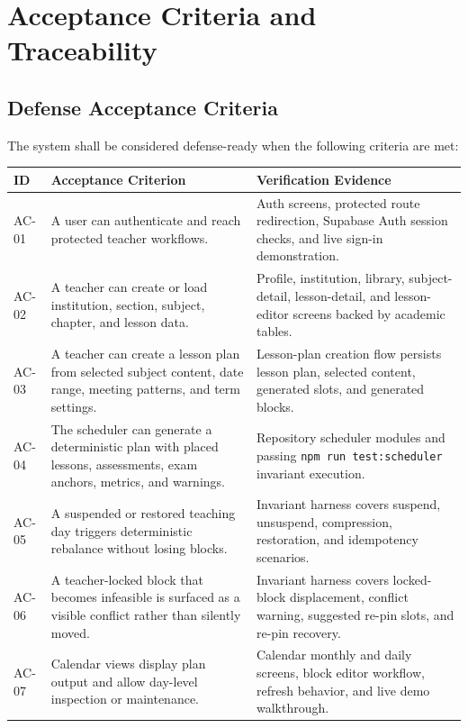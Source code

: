 \documentclass[12pt]{article}
\begin{document}
\section{Acceptance Criteria and Traceability}

\subsection{Defense Acceptance Criteria}

The system shall be considered defense-ready when the following criteria are met:

\begin{longtable}{|L{2.7cm}|L{5.4cm}|L{5.4cm}|}
\hline
\textbf{ID} & \textbf{Acceptance Criterion} & \textbf{Verification Evidence} \\
\hline
AC-01 & A user can authenticate and reach protected teacher workflows. & Auth screens, protected route redirection, Supabase Auth session checks, and live sign-in demonstration. \\
\hline
AC-02 & A teacher can create or load institution, section, subject, chapter, and lesson data. & Profile, institution, library, subject-detail, lesson-detail, and lesson-editor screens backed by academic tables. \\
\hline
AC-03 & A teacher can create a lesson plan from selected subject content, date range, meeting patterns, and term settings. & Lesson-plan creation flow persists lesson plan, selected content, generated slots, and generated blocks. \\
\hline
AC-04 & The scheduler can generate a deterministic plan with placed lessons, assessments, exam anchors, metrics, and warnings. & Repository scheduler modules and passing \texttt{npm run test:scheduler} invariant execution. \\
\hline
AC-05 & A suspended or restored teaching day triggers deterministic rebalance without losing blocks. & Invariant harness covers suspend, unsuspend, compression, restoration, and idempotency scenarios. \\
\hline
AC-06 & A teacher-locked block that becomes infeasible is surfaced as a visible conflict rather than silently moved. & Invariant harness covers locked-block displacement, conflict warning, suggested re-pin slots, and re-pin recovery. \\
\hline
AC-07 & Calendar views display plan output and allow day-level inspection or maintenance. & Calendar monthly and daily screens, block editor workflow, refresh behavior, and live demo walkthrough. \\

\end{longtable}
\end{document}
